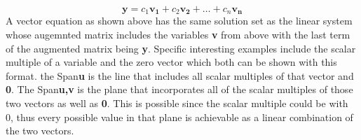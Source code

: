\documentclass[12pt]{article}
\begin{document}
\begin{equation}
    \boldsymbol{y} = c_1 \boldsymbol{v_1} + c_2 \boldsymbol{v_2} + \dots +c_n \boldsymbol{v_n}
\end{equation}
\newline
A vector equation as shown above has the same solution set as the linear system whose augemnted matrix includes the variables \textbf{v} from above %
with the last term of the augmented matrix being \textbf{y}. Specific interesting examples include the scalar multiple of a variable and the zero vector %
which both can be shown with this format. the Span{\textbf{u}} is the line that includes all scalar multiples of that vector and \textbf{0}. The Span{\textbf{u,v}} %
is the plane that incorporates all of the scalar multiples of those two vectors as well as \textbf{0}. This is possible since the scalar multiple could be with 0, %
thus every possible value in that plane is achievable as a linear combination of the two vectors.  
\newline
\end{document}
